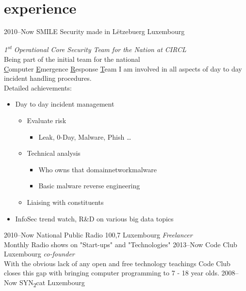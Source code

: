 \documentclass[]{friggeri-cv} %
\begin{document}
\section{experience}
\begin{entrylist}
\entry
{2010--Now}
{SMILE Security made in L\"{e}tzebuerg}
{Luxembourg}
{\emph{1\textsuperscript{st} Operational Core Security Team for the Nation at CIRCL} \\
Being part of the initial team for the national \\
\underline{C}omputer \underline{E}mergence \underline{R}esponse \underline{T}eam I am involved in all aspects of day to day incident handling procedures.\\
Detailed achievements:
\begin{itemize}
    \item Day to day incident management
    \begin{itemize}
        \item Evaluate risk
        \begin{itemize}
            \item Leak, 0-Day, Malware, Phish \ldots
        \end{itemize}
        \item Technical analysis
        \begin{itemize}
             \item Who owns that domain\/network\/malware
             \item Basic malware reverse engineering
        \end{itemize}
        \item Liaising with constituents
    \end{itemize}
    \item InfoSec trend watch, R\&D on various big data topics
\end{itemize}}
\entry
{2010--Now}
{National Public Radio 100,7}
{Luxembourg}
{\emph{Freelancer} \\
Monthly Radio shows on "Start-ups" and "Technologies"}
\entry
{2013--Now}
{Code Club}
{Luxembourg}
{\emph{co-founder} \\
With the obvious lack of any open and free technology teachings Code Club closes this gap with bringing computer programming to 7 - 18 year olds.}
\entry
{2008--Now}
{SYN\textsubscript{2}cat}
{Luxembourg}

\end{entrylist}
\end{document}
